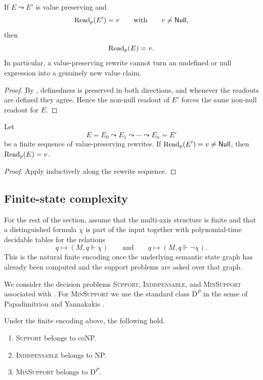 \begin{proposition}\label{prop:value-preserving-no-creation}
If $E\leadsto E'$ is value preserving and
\[
\mathrm{Read}_p(E')=v
\qquad\text{with}\qquad
v\neq \mathsf{Null},
\]
then
\[
\mathrm{Read}_p(E)=v.
\]
In particular, a value-preserving rewrite cannot turn an undefined or null expression into a genuinely new value claim.
\end{proposition}

\begin{proof}
By , definedness is preserved in both directions, and whenever the readouts are defined they agree. Hence the non-null readout of $E'$ forces the same non-null readout for $E$.
\end{proof}

\begin{corollary}\label{cor:normalization-no-fact-creation}
Let
\[
E=E_0\leadsto E_1\leadsto\cdots\leadsto E_n=E'
\]
be a finite sequence of value-preserving rewrites. If $\mathrm{Read}_p(E')=v\neq \mathsf{Null}$, then $\mathrm{Read}_p(E)=v$.
\end{corollary}

\begin{proof}
Apply  inductively along the rewrite sequence.
\end{proof}

\subsection{Finite-state complexity}

For the rest of the section, assume that the multi-axis structure is finite and that a distinguished formula $\chi$ is part of the input together with polynomial-time decidable tables for the relations
\[
q\mapsto (M,q\Vdash\chi)
\qquad\text{and}\qquad
q\mapsto (M,q\Vdash\neg\chi).
\]
This is the natural finite encoding once the underlying semantic state graph has already been computed and the support problems are asked over that graph.

We consider the decision problems \textup{\textsc{Support}}, \textup{\textsc{Indispensable}}, and \textup{\textsc{MinSupport}} associated with . For \textup{\textsc{MinSupport}} we use the standard class $\mathrm{D}^P$ in the sense of Papadimitriou and Yannakakis \cite{PapadimitriouYannakakis1984}.

\begin{theorem}\label{thm:axis-complexity-upper-bounds}
Under the finite encoding above, the following hold.
\begin{enumerate}[label=(\roman*),nosep]
\item \textup{\textsc{Support}} belongs to coNP.
\item \textup{\textsc{Indispensable}} belongs to NP.
\item \textup{\textsc{MinSupport}} belongs to $\mathrm{D}^P$.
\end{enumerate}
\end{theorem}

